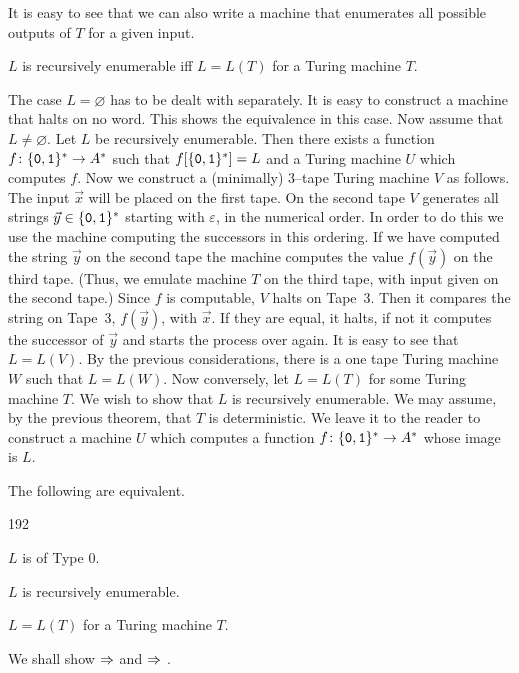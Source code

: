 It is easy to see that we can also write a machine that enumerates 
all possible outputs of $T$ for a given input.
\begin{lem}
\label{lem:aufz}
$L$ is recursively enumerable iff $L = L(T)$
for a Turing machine $T$.
\end{lem}
\proofbeg
The case $L = \varnothing$ has to be dealt with separately.
It is easy to construct a machine that halts on no word. This
shows the equivalence in this case.  Now assume that $L \neq
\varnothing$. Let $L$ be recursively enumerable. Then there
exists a function $f \colon \{\mbox{\tt 0}, \mbox{\tt 1}\}^{\ast} 
\rightarrow A^{\ast}$ such that $f[\{\mbox{\tt 0}, \mbox{\tt 1}\}^{\ast}] 
= L$ and a Turing machine $U$ which computes $f$. Now we construct 
a (minimally) 3--tape Turing machine $V$ as follows. The input 
$\vec{x}$ will be placed on the first tape. On the second tape $V$ 
generates all strings $\vec{y} \in \{\mbox{\tt 0},\mbox{\tt 1}\}^{\ast}$
starting with $\varepsilon$, in the numerical order. In order to do 
this we use the machine computing the successors in this ordering. 
If we have computed the string $\vec{y}$ on the second tape the 
machine computes the value $f(\vec{y})$ on
the third tape. (Thus, we emulate machine $T$ on the third tape,
with input given on the second tape.) Since $f$ is computable,
$V$ halts on Tape~3. Then it compares the string on Tape~3,
$f(\vec{y})$, with $\vec{x}$. If they are equal, it halts, if
not it computes the successor of $\vec{y}$ and starts the process 
over again. It is easy to see that $L = L(V)$. By the previous 
considerations, there is a one tape Turing machine $W$ such that 
$L = L(W)$. Now conversely, let $L = L(T)$ for some Turing machine $T$.
We wish to show that $L$ is recursively enumerable. We may
assume, by the previous theorem, that $T$ is deterministic.
We leave it to the reader to construct a machine $U$ which 
computes a function $f \colon \{\mbox{\tt 0},\mbox{\tt 1}\}^{\ast} 
\rightarrow A^{\ast}$ whose image is $L$. 
\proofend
\begin{thm}
\label{thm:typ0}
The following are equivalent.
\begin{dingautolist}{192}
\item
$L$ is of Type 0.
\item
$L$ is recursively enumerable.
\item
$L = L(T)$ for a Turing machine $T$.
\end{dingautolist}
\end{thm}
\proofbeg
We shall show  $\Rightarrow$  and  $\Rightarrow$ . 
